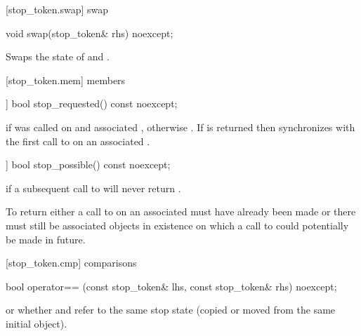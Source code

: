 {%
[stop_token.swap]{ swap}

%
\begin{itemdecl}
void swap(stop_token& rhs) noexcept;
\end{itemdecl}

\begin{itemdescr}
\pnum
\effects Swaps the state of  and .
\end{itemdescr}


[stop_token.mem]{ members}

%
\begin{itemdecl}
[[nodiscard]] bool stop_requested() const noexcept;
\end{itemdecl}
\begin{itemdescr}
  \pnum\returns {} if  was called on and
                associated , otherwise .
  \pnum\sync If  is returned then synchronizes with the
             first call to  on an associated
             .
\end{itemdescr}

%
\begin{itemdecl}
[[nodiscard]] bool stop_possible() const noexcept;
\end{itemdecl}
\begin{itemdescr}
  \pnum\returns {} if a subsequent call to  will never return .
                \begin{note}To return  either a call to 
                  on an associated  must have already been made or there
                  must still be associated  objects in existence on which
                  a call to  could potentially be made in future.
                \end{note}
\end{itemdescr}


[stop_token.cmp]{ comparisons}

%
\begin{itemdecl}
bool operator== (const stop_token& lhs, const stop_token& rhs) noexcept;
\end{itemdecl}
\begin{itemdescr}
  \pnum\returns {} or
                whether  and  refer to the
                same stop state
                (copied or moved from the same initial  object).
\end{itemdescr}

}
